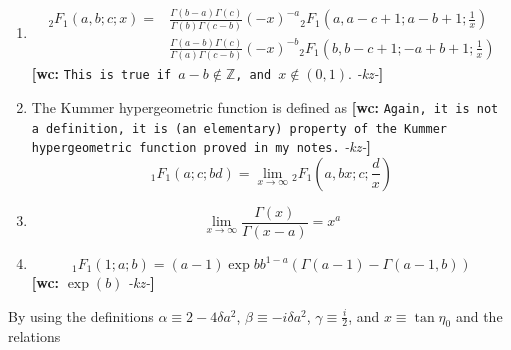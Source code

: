 \documentclass[preprint,notitlepage,amsmath,amssymb,floatfix]{revtex4-1}
\newcommand{\XXX}[3]{{\bf [#1: } {\tt #3} {\it -#2-}{\bf ]}}
\begin{document}
\begin{enumerate}
  \item 
  \begin{equation}
    \begin{split}
    {}_2F_1\left(a,b;c;x\right) =& \frac{\Gamma\left(b-a\right)\Gamma\left(c\right)}{\Gamma\left(b\right)\Gamma\left(c-b\right)}\left(-x\right)^{-a} {}_2F_1\left(a,a-c+1;a-b+1;\frac{1}{x}\right) \\
    & \frac{\Gamma\left(a-b\right)\Gamma\left(c\right)}{\Gamma\left(a\right)\Gamma\left(c-b\right)}\left(-x\right)^{-b} {}_2F_1\left(b,b-c+1;-a+b+1;\frac{1}{x}\right)
    \end{split}
  \end{equation}
  \XXX{wc}{kz}{This is true if $a-b\notin \mathbb{Z}$, and $x\notin(0,1).$}

  \item The Kummer hypergeometric function is defined as \XXX{wc}{kz}{Again, it is not a definition, it is (an elementary) property of the Kummer hypergeometric function proved in my notes.}
  \begin{equation}
  {}_1F_1\left(a;c;bd\right) = \lim_{x\to\infty} {}_2F_1\left(a,bx;c;\frac{d}{x}\right)
  \end{equation}

  \item
  \begin{equation}
  \lim_{x\to\infty}\frac{\Gamma\left(x\right)}{\Gamma\left(x-a\right)} = x^a
  \end{equation}

  \item
  \begin{equation}\label{78}
  {}_1F_1\left(1;a;b\right) = \left(a-1\right)\exp{b}b^{1-a}\left(\Gamma\left(a-1\right)-\Gamma\left(a-1,b\right)\right)
  \end{equation}
  \XXX{wc}{kz}{$\exp(b)$}
\end{enumerate}

\noindent By using the definitions $\alpha\equiv 2-4\delta a^2$, $\beta\equiv -i\delta a^2$, $\gamma\equiv\frac{i}{2}$, and $x\equiv\tan\eta_0$ and the relations
\end{document}
